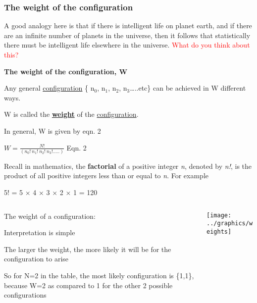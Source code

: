 \documentclass[a4paper,12pt,titlepage]{article}
\begin{document}
\begin{frame}[allowframebreaks=0.7]
\frametitle{The weight of the configuration}
A good analogy here is that if there is intelligent life on planet earth, and if there are an infinite number of planets in the universe, then it follows that statistically there must be intelligent life elsewhere in the universe. \textcolor{red}{What do you think about this?}\par\hrulefill\medskip


\textbf{The weight of the configuration, W}
 
Any general \underline{configuration} \{ n\(_0\), n\(_1\), n\(_2\), n\(_3\)…..etc\} can be achieved in W different ways.\par\smallskip
 
W is called the \underline{\textbf{weight}} of the \underline{configuration}.\par\smallskip
 
In general, W is given by eqn. 2\par\medskip
 
\begin{center} \(W = \frac{N!}{(n_0!\  n_1!\  n_2!\  n_3! …..)}\)    Eqn. 2\end{center}\par\medskip
 
Recall in mathematics, the \textbf{factorial} of a positive integer \textit{n}, denoted by \textit{n!}, is the product of all positive integers less than or equal to \textit{n}. For example\par\smallskip

\begin{center}5! = 5 × 4 × 3 × 2 × 1 = 120\end{center}
\end{frame}

\begin{frame}
\begin{columns}[onlytextwidth]
\begin{column}{.4\textwidth}
The weight of a configuration:\par
Interpretation is simple\par
The larger the weight, the more likely it will be for the configuration to arise	\par\medskip
So for N=2 in the table, the most likely configuration is \{1,1\}, because W=2 as compared to 1 for the other 2 possible configurations
\end{column}
\begin{column}{.6\textwidth}
\texttt{[image: ../graphics/weights]}
\end{column}
\end{columns}
\end{frame}
\end{document}

